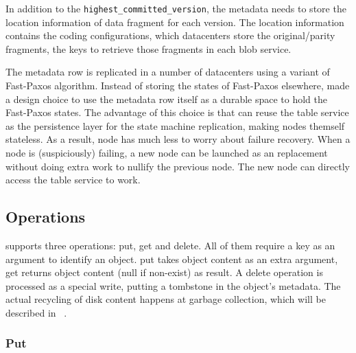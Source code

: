 In addition to the \texttt{highest\_committed\_version}, the metadata needs to store the
location information of data fragment for each version. The location information contains
the coding configurations, which datacenters store the original/parity fragments, the keys
to retrieve those fragments in each blob service.

The metadata row is replicated in a number of datacenters using a variant of Fast-Paxos
algorithm. Instead of storing the states of Fast-Paxos elsewhere, {\name} made a design
choice to use the metadata row itself as a durable space to hold the Fast-Paxos states.
The advantage of this choice is that {\name} can reuse the table service as the persistence
layer for the state machine replication, making {\name} nodes themself stateless. As a
result, {\name} node has much less to worry about failure recovery. When a {\name} node
is (suspiciously) failing, a new {\name} node can be launched as an replacement without
doing extra work to nullify the previous node. The new node can directly access the table
service to work. 



\subsection{{\name} Operations}

{\name} supports three operations: put, get and delete. All of them require a key as
an argument to identify an object. put takes object content as an extra argument, get
returns object content (null if non-exist) as result. A delete operation is processed
as a special write, putting a tombstone in the object's metadata. The actual recycling
of disk content happens at garbage collection, which will be described in ~.

\subsubsection{Put}

